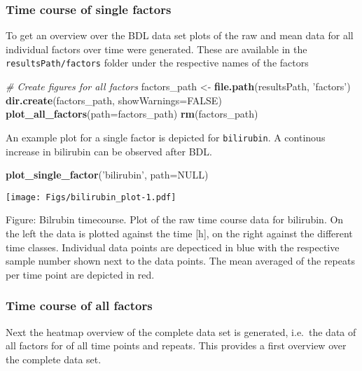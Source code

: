 \documentclass[]{article}
\newenvironment{Shaded}{\begin{snugshade}}{\end{snugshade}}
\newcommand{\KeywordTok}[1]{\textcolor[rgb]{0.13,0.29,0.53}{\textbf{{#1}}}}
\newcommand{\DataTypeTok}[1]{\textcolor[rgb]{0.13,0.29,0.53}{{#1}}}
\newcommand{\StringTok}[1]{\textcolor[rgb]{0.31,0.60,0.02}{{#1}}}
\newcommand{\CommentTok}[1]{\textcolor[rgb]{0.56,0.35,0.01}{\textit{{#1}}}}
\newcommand{\OtherTok}[1]{\textcolor[rgb]{0.56,0.35,0.01}{{#1}}}
\newcommand{\NormalTok}[1]{{#1}}
\begin{document}
\subsubsection{Time course of single
factors}\label{time-course-of-single-factors}

To get an overview over the BDL data set plots of the raw and mean data
for all individual factors over time were generated. These are available
in the \texttt{resultsPath/factors} folder under the respective names of
the factors

\begin{Shaded}
\begin{Highlighting}[]
\CommentTok{# Create figures for all factors}
\NormalTok{factors_path <-}\StringTok{ }\KeywordTok{file.path}\NormalTok{(resultsPath, }\StringTok{'factors'}\NormalTok{)}
\KeywordTok{dir.create}\NormalTok{(factors_path, }\DataTypeTok{showWarnings=}\OtherTok{FALSE}\NormalTok{)}
\KeywordTok{plot_all_factors}\NormalTok{(}\DataTypeTok{path=}\NormalTok{factors_path)}
\KeywordTok{rm}\NormalTok{(factors_path)}
\end{Highlighting}
\end{Shaded}

An example plot for a single factor is depicted for \texttt{bilirubin}.
A continous increase in bilirubin can be observed after BDL.

\begin{Shaded}
\begin{Highlighting}[]
\KeywordTok{plot_single_factor}\NormalTok{(}\StringTok{'bilirubin'}\NormalTok{, }\DataTypeTok{path=}\OtherTok{NULL}\NormalTok{)}
\end{Highlighting}
\end{Shaded}

\texttt{[image: Figs/bilirubin\_plot-1.pdf]}

Figure: Bilrubin timecourse. Plot of the raw time course data for
bilirubin. On the left the data is plotted against the time {[}h{]}, on
the right against the different time classes. Individual data points are
depecticed in blue with the respective sample number shown next to the
data points. The mean averaged of the repeats per time point are
depicted in red.

\subsubsection{Time course of all
factors}\label{time-course-of-all-factors}

Next the heatmap overview of the complete data set is generated,
i.e.~the data of all factors for of all time points and repeats. This
provides a first overview over the complete data set.
\end{document}
